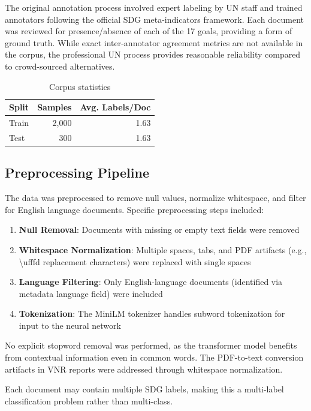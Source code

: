 \documentclass[12pt,a4paper]{article}
\begin{document}
The original annotation process involved expert labeling by UN staff and trained annotators following the official SDG meta-indicators framework. Each document was reviewed for presence/absence of each of the 17 goals, providing a form of ground truth. While exact inter-annotator agreement metrics are not available in the corpus, the professional UN process provides reasonable reliability compared to crowd-sourced alternatives.

\begin{table}[htbp]
\caption{Corpus statistics}
\label{tab:corpus-stats}
\centering
\begin{tabular}{lrr}
\toprule
Split & Samples & Avg. Labels/Doc \\
\midrule
Train & 2,000 & 1.63 \\
Test & 300 & 1.63 \\
\bottomrule
\end{tabular}
\end{table}

\subsection{Preprocessing Pipeline}

The data was preprocessed to remove null values, normalize whitespace, and filter for English language documents. Specific preprocessing steps included:

\begin{enumerate}
    \item \textbf{Null Removal}: Documents with missing or empty text fields were removed
    \item \textbf{Whitespace Normalization}: Multiple spaces, tabs, and PDF artifacts (e.g., \textbackslash ufffd replacement characters) were replaced with single spaces
    \item \textbf{Language Filtering}: Only English-language documents (identified via metadata language field) were included
    \item \textbf{Tokenization}: The MiniLM tokenizer handles subword tokenization for input to the neural network
\end{enumerate}

No explicit stopword removal was performed, as the transformer model benefits from contextual information even in common words. The PDF-to-text conversion artifacts in VNR reports were addressed through whitespace normalization.

Each document may contain multiple SDG labels, making this a multi-label classification problem rather than multi-class.
\end{document}
